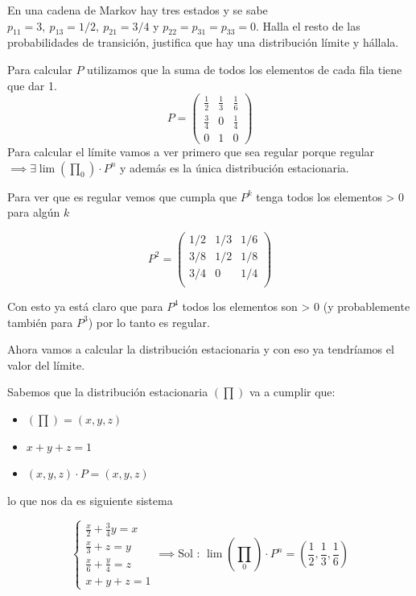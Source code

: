 \begin{problem}[5]
	En una cadena de Markov hay tres estados y se sabe $p_{11} = 3,\ p_{13} = 1/2, \ p_{21} = 3/4$  y $
	p_{22} = p_{31} = p_{33} = 0$. Halla el resto de las probabilidades de transición, justifica que hay una distribución límite y hállala.
	\solution

	Para calcular $P$ utilizamos que la suma de todos los elementos de cada fila tiene que dar 1.
	$$P = \left( \begin{matrix}
	\frac{1}{2}&\boxed{\frac{1}{3}}&\frac{1}{6}\\
	\frac{3}{4}&0&\boxed{\frac{1}{4}}\\
	0&\boxed{1}&0
	\end{matrix}\right)$$
	Para calcular el límite vamos a ver primero que sea regular porque regular $\implies \exists \lim (\prod_0)\cdot P^n$ y además es la única distribución estacionaria.

	Para ver que es regular vemos que cumpla que $P^k$ tenga todos los elementos > 0 para algún $k$

	$$P^2 = \left( \begin{matrix}
	1/2&1/3&1/6\\
	3/8&1/2&1/8\\
	3/4&0&1/4\\
	\end{matrix}\right)$$

	Con esto ya está claro que para $P^4$ todos los elementos son > 0 (y probablemente también para $P^3$) por lo tanto es regular.

	Ahora vamos a calcular la distribución estacionaria y con eso ya tendríamos el valor del límite.

	Sabemos que la distribución estacionaria $(\prod)$ va a cumplir que:
	\begin{itemize}
		\item $(\prod) = (x,y,z)$
		\item $x+y+z = 1$
		\item $(x,y,z) \cdot P = (x,y,z)$
	\end{itemize}
	lo que nos da es siguiente sistema

	$$\begin{cases}
	\frac{x}{2} + \frac{3}{4}y = x\\
	\frac{x}{3} + z = y\\
	\frac{x}{6} + \frac{y}{4} = z\\
	x + y + z = 1
	\end{cases} \implies \text{Sol : } \lim\left(\prod_0\right) \cdot P^n = \left(\frac{1}{2}, \frac{1}{3}, \frac{1}{6}\right)$$


\end{problem}

